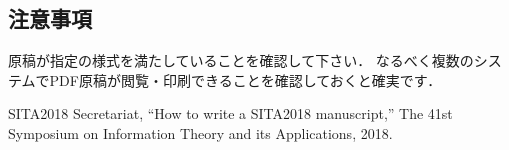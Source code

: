 \documentclass{jarticle}
\begin{document}
\subsection{注意事項}
原稿が指定の様式を満たしていることを確認して下さい．
なるべく複数のシステムでPDF原稿が閲覧・印刷できることを確認しておくと確実です．

\renewcommand{\refname}{文献}

\begin{thebibliography}{99}
SITA2018 Secretariat, 
``How to write a SITA2018 manuscript,'' 
The 41st Symposium on Information Theory and its Applications, 2018.
\end{thebibliography}
\end{document}
